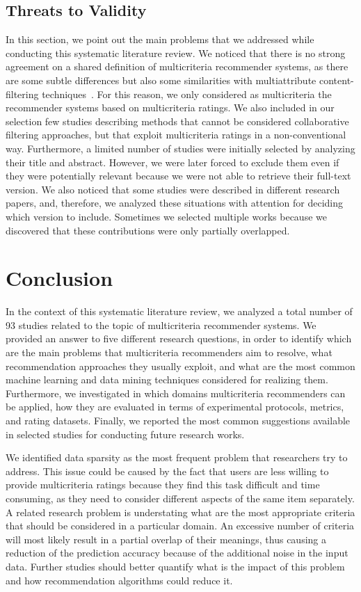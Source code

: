 \subsection{Threats to Validity}

In this section, we point out the main problems that we addressed while conducting this systematic literature review. We noticed that there is no strong agreement on a shared definition of multicriteria recommender systems, as there are some subtle differences but also some similarities with multiattribute content-filtering techniques~\cite{Adomavicius2015}. For this reason, we only considered as multicriteria the recommender systems based on multicriteria ratings. We also included in our selection few studies describing methods that cannot be considered collaborative filtering approaches, but that exploit multicriteria ratings in a non-conventional way. Furthermore, a limited number of studies were initially selected by analyzing their title and abstract. However, we were later forced to exclude them even if they were potentially relevant because we were not able to retrieve their full-text version. We also noticed that some studies were described in different research papers, and, therefore, we analyzed these situations with attention for deciding which version to include. Sometimes we selected multiple works because we discovered that these contributions were only partially overlapped.

\section{Conclusion}
\label{mcr:sec:conclusions}

In the context of this systematic literature review, we analyzed a total number of 93 studies related to the topic of multicriteria recommender systems. We provided an answer to five different research questions, in order to identify which are the main problems that multicriteria recommenders aim to resolve, what recommendation approaches they usually exploit, and what are the most common machine learning and data mining techniques considered for realizing them. Furthermore, we investigated in which domains multicriteria recommenders can be applied, how they are evaluated in terms of experimental protocols, metrics, and rating datasets. Finally, we reported the most common suggestions available in selected studies for conducting future research works.

We identified data sparsity as the most frequent problem that researchers try to address. This issue could be caused by the fact that users are less willing to provide multicriteria ratings because they find this task difficult and time consuming, as they need to consider different aspects of the same item separately. A related research problem is understating what are the most appropriate criteria that should be considered in a particular domain. An excessive number of criteria will most likely result in a partial overlap of their meanings, thus causing a reduction of the prediction accuracy because of the additional noise in the input data. Further studies should better quantify what is the impact of this problem and how recommendation algorithms could reduce it.

